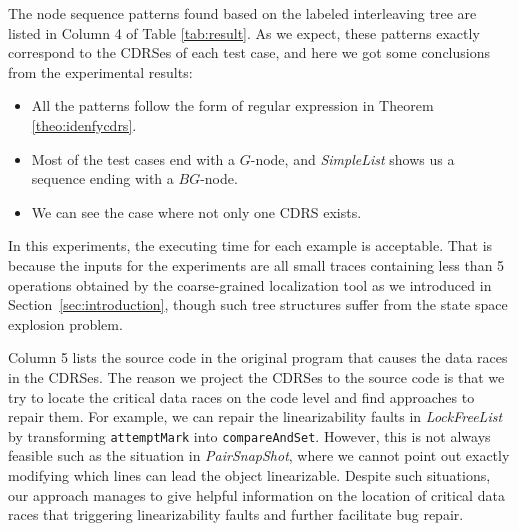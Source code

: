 \documentclass[runningheads]{llncs}
\begin{document}

The node sequence patterns found based on the labeled interleaving tree are listed in Column 4 of Table \ref{tab:result}. 
As we expect, these patterns exactly correspond to the CDRSes of each test case, and here we got some conclusions from the experimental results:
\begin{itemize}
\item All the patterns follow the form of regular expression in Theorem \ref{theo:idenfycdrs}. 
\item Most of the test cases end with a $G$-node, and \textit{SimpleList} shows us a sequence ending with a $BG$-node.
\item We can see the case where not only one CDRS exists. 
\end{itemize}

In this experiments, the executing time for each example is acceptable. That is because the inputs for the experiments are all small traces containing less than 5 operations 
obtained by the coarse-grained localization tool \cite{DBLP:conf/seke/ZhangWZ17}  as we introduced in Section~\ref{sec:introduction}, though such tree structures suffer from the state space explosion problem.

Column 5 lists the source code in the original program that causes the data races in the CDRSes. The reason we project the CDRSes to the source code is that we try to locate the critical data races on the code level and find approaches to repair them.
For example, we can repair the linearizability faults in \textit{LockFreeList} by transforming \texttt{attemptMark} into \texttt{compareAndSet}. However, this is not always feasible such as the situation in \textit{PairSnapShot}, where we cannot point out exactly modifying which lines can lead the object linearizable. Despite such situations, our approach manages to give  helpful information on the location of critical data races that triggering linearizability faults  and further facilitate bug repair.

\end{document}
